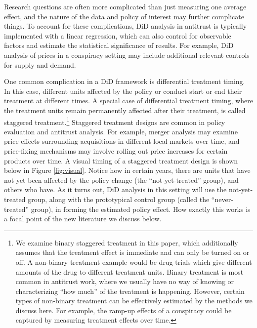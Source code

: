 \documentclass[12pt]{article}
\begin{document}
Research questions are often more complicated than just measuring one average effect, and the nature of the data and policy of interest may further complicate things. To account for these complications, DiD analysis in antitrust is typically implemented with a linear regression, which can also control for observable factors and estimate the statistical significance of results. For example, DiD analysis of prices in a conspiracy setting may include additional relevant controls for supply and demand.

One common complication in a DiD framework is differential treatment timing. In this case, different units affected by the policy or conduct start or end their treatment at different times. A special case of differential treatment timing, where the treatment units remain permanently affected after their treatment, is called staggered treatment.\footnote{We examine binary staggered treatment in this paper, which additionally assumes that the treatment effect is immediate and can only be turned on or off. A non-binary treatment example would be drug trials which give different amounts of the drug to different treatment units. Binary treatment is most common in antitrust work, where we usually have no way of knowing or characterizing “how much” of the treatment is happening. However, certain types of non-binary treatment can be effectively estimated by the methods we discuss here. For example, the ramp-up effects of a conspiracy could be captured by measuring treatment effects over time.}  Staggered treatment designs are common in policy evaluation and antitrust analysis. For example, merger analysis may examine price effects surrounding acquisitions in different local markets over time, and price-fixing mechanisms may involve rolling out price increases for certain products over time. A visual timing of a staggered treatment design is shown below in Figure \ref{fig:visual}. Notice how in certain years, there are units that have not yet been affected by the policy change (the “not-yet-treated” group), and others who have. As it turns out, DiD analysis in this setting will use the not-yet-treated group, along with the prototypical control group (called the “never-treated” group), in forming the estimated policy effect. How exactly this works is a focal point of the new literature we discuss below.
\end{document}
